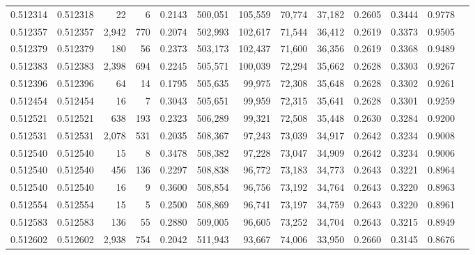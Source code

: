 \begin{tabular}{rrrrrrrrrrrrr}
0.512314 & 0.512318 &    22 &     6 &                                     0.2143 & 500,051 & 105,559 &  70,774 &  37,182 & 0.2605 & 0.3444 & 0.9778 \\
0.512357 & 0.512357 & 2,942 &   770 &                                     0.2074 & 502,993 & 102,617 &  71,544 &  36,412 & 0.2619 & 0.3373 & 0.9505 \\
0.512379 & 0.512379 &   180 &    56 &                                     0.2373 & 503,173 & 102,437 &  71,600 &  36,356 & 0.2619 & 0.3368 & 0.9489 \\
0.512383 & 0.512383 & 2,398 &   694 &                                     0.2245 & 505,571 & 100,039 &  72,294 &  35,662 & 0.2628 & 0.3303 & 0.9267 \\
0.512396 & 0.512396 &    64 &    14 &                                     0.1795 & 505,635 &  99,975 &  72,308 &  35,648 & 0.2628 & 0.3302 & 0.9261 \\
0.512454 & 0.512454 &    16 &     7 &                                     0.3043 & 505,651 &  99,959 &  72,315 &  35,641 & 0.2628 & 0.3301 & 0.9259 \\
0.512521 & 0.512521 &   638 &   193 &                                     0.2323 & 506,289 &  99,321 &  72,508 &  35,448 & 0.2630 & 0.3284 & 0.9200 \\
0.512531 & 0.512531 & 2,078 &   531 &                                     0.2035 & 508,367 &  97,243 &  73,039 &  34,917 & 0.2642 & 0.3234 & 0.9008 \\
0.512540 & 0.512540 &    15 &     8 &                                     0.3478 & 508,382 &  97,228 &  73,047 &  34,909 & 0.2642 & 0.3234 & 0.9006 \\
0.512540 & 0.512540 &   456 &   136 &                                     0.2297 & 508,838 &  96,772 &  73,183 &  34,773 & 0.2643 & 0.3221 & 0.8964 \\
0.512540 & 0.512540 &    16 &     9 &                                     0.3600 & 508,854 &  96,756 &  73,192 &  34,764 & 0.2643 & 0.3220 & 0.8963 \\
0.512554 & 0.512554 &    15 &     5 &                                     0.2500 & 508,869 &  96,741 &  73,197 &  34,759 & 0.2643 & 0.3220 & 0.8961 \\
0.512583 & 0.512583 &   136 &    55 &                                     0.2880 & 509,005 &  96,605 &  73,252 &  34,704 & 0.2643 & 0.3215 & 0.8949 \\
0.512602 & 0.512602 & 2,938 &   754 &                                     0.2042 & 511,943 &  93,667 &  74,006 &  33,950 & 0.2660 & 0.3145 & 0.8676 \\

\end{tabular}
